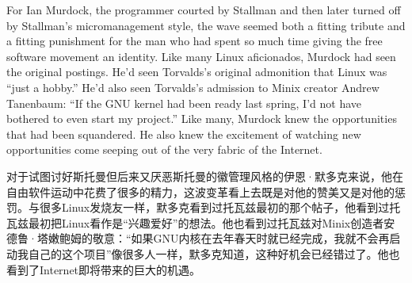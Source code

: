 \ifdefined\eng
For Ian Murdock, the programmer courted by Stallman and then later turned off by Stallman's micromanagement style, the wave seemed both a fitting tribute and a fitting punishment for the man who had spent so much time giving the free software movement an identity. Like many Linux aficionados, Murdock had seen the original postings. He'd seen Torvalds's original admonition that Linux was ``just a hobby.'' He'd also seen Torvalds's admission to Minix creator Andrew Tanenbaum: ``If the GNU kernel had been ready last spring, I'd not have bothered to even start my project.'' Like many, Murdock knew the opportunities that had been squandered. He also knew the excitement of watching new opportunities come seeping out of the very fabric of the Internet.
\fi

\ifdefined\chs
对于试图讨好斯托曼但后来又厌恶斯托曼的徽管理风格的伊恩·默多克来说，他在自由软件运动中花费了很多的精力，这波变革看上去既是对他的赞美又是对他的惩罚。与很多Linux发烧友一样，默多克看到过托瓦兹最初的那个帖子，他看到过托瓦兹最初把Linux看作是``兴趣爱好''的想法。他也看到过托瓦兹对Minix创造者安德鲁·塔嫩鲍姆的敬意：``如果GNU内核在去年春天时就已经完成，我就不会再启动我自己的这个项目''像很多人一样，默多克知道，这种好机会已经错过了。他也看到了Internet即将带来的巨大的机遇。
\fi


